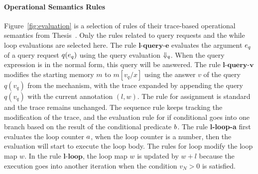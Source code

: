   \paragraph*{Operational Semantics Rules}
Figure~\ref{fig:evaluation} is a selection of rules of their trace-based operational semantics from {Thesis~\cite{weihao22}}.
Only the rules related to query requests and the while loop evaluations are selected here.
The rule $\textbf{l-query-e}$ evaluates the argument $e_q$ of a query request $q(e_q)$ using the query evaluation $\Downarrow_q$.
When the query expression is in the normal form, this query will be answered.
The rule $\textbf{l-query-v}$ modifies the starting memory $m$ to $m[v_q/x]$ using the answer $v$ of the query $q(v_q)$ from the mechanism, with the trace expanded by appending the query $q(v_q)$ with the current annotation $(l,w)$.
The rule for assignment is standard and the trace remains unchanged.
The sequence rule keeps tracking the modification of the trace, and the evaluation rule for if conditional goes into one branch based on the result of the conditional predicate $b$. 
The rule \textbf{l-loop-a} first evaluates the loop counter $a$, when the loop counter is a number, then the evaluation will start to execute the loop body.
The rules for loop modify the loop map $w$. In the rule $\textbf{l-loop}$, the loop map $w$ is updated by $w + l$ because the execution goes into another iteration when the condition $v_N >0$ is satisfied.
% 
